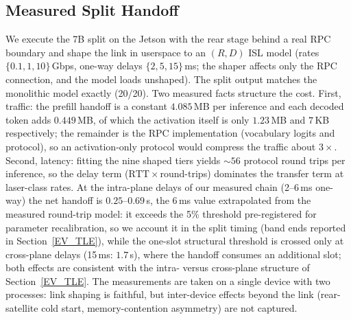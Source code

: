 \subsection{Measured Split Handoff}\label{EV_HANDOFF}
We execute the 7B split on the Jetson with the rear stage behind a real RPC
boundary and shape the link in userspace to an $(R, D)$ ISL model (rates
$\{0.1, 1, 10\}$\,Gbps, one-way delays $\{2, 5, 15\}$\,ms; the shaper affects
only the RPC connection, and the model loads unshaped). The split output
matches the monolithic model exactly (20/20). Two measured facts structure the
cost. First, traffic: the prefill handoff is a constant $4.085$\,MB per
inference and each decoded token adds $0.449$\,MB, of which the activation
itself is only $1.23$\,MB and $7$\,KB respectively; the remainder is the RPC
implementation (vocabulary logits and protocol), so an activation-only
protocol would compress the traffic about $3\times$. Second, latency: fitting
the nine shaped tiers yields ${\sim}56$ protocol round trips per inference, so
the delay term ($\mathrm{RTT}\times$round-trips) dominates the transfer term
at laser-class rates. At the intra-plane delays of our measured chain
(2--6\,ms one-way) the net handoff is $0.25$--$0.69$\,s, the 6\,ms value
extrapolated from the measured round-trip model: it exceeds the 5\% threshold
pre-registered for parameter recalibration, so we account it in the split
timing (band ends reported in Section~\ref{EV_TLE}), while the one-slot
structural threshold is crossed only at cross-plane delays (15\,ms: $1.7$\,s),
where the handoff consumes an additional slot; both effects are consistent
with the intra- versus cross-plane structure of Section~\ref{EV_TLE}. The
measurements are taken on a single device with two processes: link shaping is
faithful, but inter-device effects beyond the link (rear-satellite cold start,
memory-contention asymmetry) are not captured.

